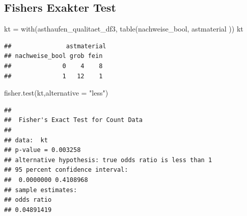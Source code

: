 \documentclass[
  oneside]{scrbook}
\newenvironment{Shaded}{\begin{snugshade}}{\end{snugshade}}
\newcommand{\AttributeTok}[1]{\textcolor[rgb]{0.77,0.63,0.00}{#1}}
\newcommand{\FunctionTok}[1]{\textcolor[rgb]{0.00,0.00,0.00}{#1}}
\newcommand{\NormalTok}[1]{#1}
\newcommand{\OtherTok}[1]{\textcolor[rgb]{0.56,0.35,0.01}{#1}}
\newcommand{\StringTok}[1]{\textcolor[rgb]{0.31,0.60,0.02}{#1}}
\begin{document}
\hypertarget{fishers-exakter-test}{%
\subsection{Fishers Exakter Test}\label{fishers-exakter-test}}

\begin{Shaded}
\begin{Highlighting}[]
\NormalTok{kt }\OtherTok{=} \FunctionTok{with}\NormalTok{(asthaufen\_qualitaet\_df3, }\FunctionTok{table}\NormalTok{(nachweise\_bool, astmaterial ))}
\NormalTok{kt}
\end{Highlighting}
\end{Shaded}

\begin{verbatim}
##               astmaterial
## nachweise_bool grob fein
##              0    4    8
##              1   12    1
\end{verbatim}

\begin{Shaded}
\begin{Highlighting}[]
\FunctionTok{fisher.test}\NormalTok{(kt,}\AttributeTok{alternative =} \StringTok{"less"}\NormalTok{)}
\end{Highlighting}
\end{Shaded}

\begin{verbatim}
## 
##  Fisher's Exact Test for Count Data
## 
## data:  kt
## p-value = 0.003258
## alternative hypothesis: true odds ratio is less than 1
## 95 percent confidence interval:
##  0.0000000 0.4108968
## sample estimates:
## odds ratio 
## 0.04891419
\end{verbatim}
\end{document}
